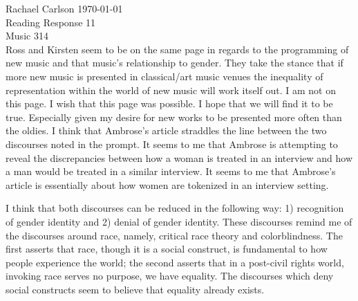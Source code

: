 \documentclass[12pt]{article}
\begin{document}
\noindent Rachael Carlson \hfill \today\\
\noindent Reading Response 11\\
\noindent Music 314\\



\noindent Ross and Kirsten seem to be on the same page in regards to
the programming of new music and that music's relationship to
gender. They take the stance that if more new music is presented in
classical/art music venues the inequality of representation within the
world of new music will work itself out. I am not on this page. I wish
that this page was possible. I hope that we will find it to be
true. Especially given my desire for new works to be presented more
often than the oldies. I think that Ambrose's article straddles the
line between the two discourses noted in the prompt. It seems to me
that Ambrose is attempting to reveal the discrepancies between how a
woman is treated in an interview and how a man would be treated in a
similar interview. It seems to me that Ambrose's article is
essentially about how women are tokenized in an interview setting.

I think that both discourses can be reduced in the following way: 1)
recognition of gender identity and 2) denial of gender identity. These
discourses remind me of the discourses around race, namely, critical
race theory and colorblindness. The first asserts that race, though it
is a social construct, is fundamental to how people experience the
world; the second asserts that in a post-civil rights world, invoking
race serves no purpose, we have equality. The discourses which deny
social constructs seem to believe that equality already
exists.
\end{document}
